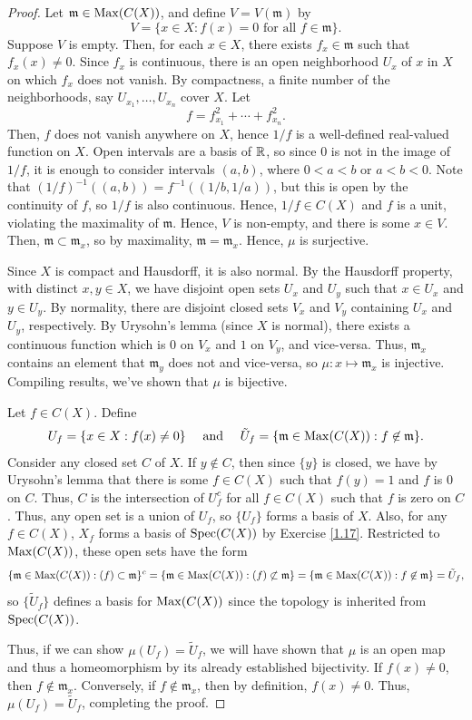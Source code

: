\begin{proof}
Let $\mathfrak{m} \in \operatorname{Max}(C(X))$, and define $V = V(\mathfrak{m})$ by
$$V = \{x \in X : f(x) = 0 \text{ for all } f \in \mathfrak{m}\}.$$
Suppose $V$ is empty. Then, for each $x \in X$, there exists $f_x \in \mathfrak{m}$ such that $f_x(x) \neq 0$. Since $f_x$ is continuous, there is an open neighborhood $U_x$ of $x$ in $X$ on which $f_x$
does not vanish. By compactness, a finite number of the neighborhoods, say $U_{x_1},\ldots,U_{x_n}$ cover $X$. Let
$$f = f_{x_1}^2 + \cdots + f_{x_n}^2.$$
Then, $f$ does not vanish anywhere on $X$, hence $1/f$ is a well-defined real-valued function on $X$. Open intervals are a basis of $\mathbb{R}$, so since $0$ is not in the image of $1/f$, it is enough to consider
intervals $(a,b)$, where $0 < a < b$ or $a < b < 0$. Note that $(1/f)^{-1}((a,b)) = f^{-1}((1/b,1/a))$, but this is open by the continuity of $f$, so $1/f$ is also continuous. Hence, $1/f \in C(X)$ and $f$ is
a unit, violating the maximality of $\mathfrak{m}$. Hence, $V$ is non-empty, and there is some $x \in V$. Then, $\mathfrak{m} \subset \mathfrak{m}_x$, so by maximality, $\mathfrak{m} = \mathfrak{m}_x$. 
Hence, $\mu$ is surjective.

Since $X$ is compact and Hausdorff, it is also normal. By the Hausdorff property, with distinct $x,y \in X$, we have disjoint open sets $U_x$ and $U_y$ such that $x \in U_x$ and $y \in U_y$. By normality, there
are disjoint closed sets $V_x$ and $V_y$ containing $U_x$ and $U_y$, respectively. By Urysohn's lemma (since $X$ is normal), there exists a continuous function which is $0$ on $V_x$ and $1$ on $V_y$, and vice-versa.
Thus, $\mathfrak{m}_x$ contains an element that $\mathfrak{m}_y$ does not and vice-versa, so $\mu: x \mapsto \mathfrak{m}_x$ is injective. Compiling results, we've shown that $\mu$ is bijective.

Let $f \in C(X)$. Define
$$U_f = \{x \in X : f(x) \neq 0\} \quad\text{ and }\quad \tilde U_f = \{\mathfrak{m} \in \operatorname{Max}(C(X)) : f \not\in \mathfrak{m}\}.$$
Consider any closed set $C$ of $X$. If $y \not\in C$, then since $\{y\}$ is closed, we have by Urysohn's lemma that there is some $f \in C(X)$ such that $f(y) = 1$ and $f$ is $0$ on $C$. Thus, $C$ is the
intersection of $U_f^c$ for all $f \in C(X)$ such that $f$ is zero on $C$. Thus, any open set is a union of $U_f$, so $\{U_f\}$ forms a basis of $X$.
Also, for any $f \in C(X)$, $X_f$ forms a basis of $\operatorname{Spec}(C(X))$ by Exercise \ref{1.17}. Restricted to $\operatorname{Max}(C(X))$, these open sets have the form
$$\{\mathfrak{m} \in \operatorname{Max}(C(X)) : (f) \subset \mathfrak{m}\}^c = \{\mathfrak{m} \in \operatorname{Max}(C(X)) : (f) \not\subset \mathfrak{m}\} = \{\mathfrak{m} \in \operatorname{Max}(C(X)) : f \not\in \mathfrak{m}\} = \tilde U_f,$$
so $\{\tilde U_f\}$ defines a basis for $\operatorname{Max}(C(X))$ since the topology is inherited from $\operatorname{Spec}(C(X))$.

Thus, if we can show $\mu(U_f) = \tilde U_f$, we will have shown that $\mu$ is an open map and thus a homeomorphism by its already established bijectivity.
If $f(x) \neq 0$, then $f \not\in \mathfrak{m}_x$. Conversely, if $f \not\in \mathfrak{m}_x$, then by definition, $f(x) \neq 0$. Thus, $\mu(U_f) = \tilde U_f$, completing the proof.
\end{proof}

